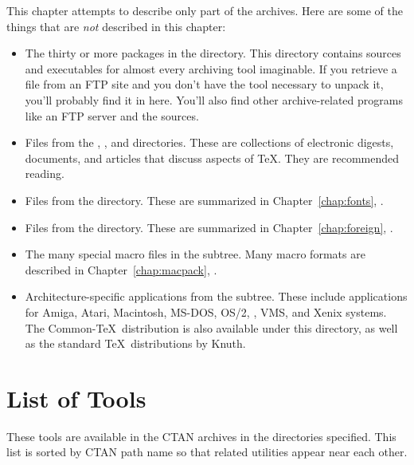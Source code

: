 This chapter attempts to describe only part of the archives.  Here are some
of the things that are {\em not\/} described in this chapter:

\begin{itemize}
  \item The thirty or more packages in the  directory.
        This directory contains sources and executables for almost every 
        archiving tool imaginable.  If you retrieve a file from an FTP site
        and you don't have the tool necessary to unpack it, you'll probably
        find it in here.  You'll also find other archive-related programs
        like an FTP server and the  sources.
  
  \item Files from the , , and
         directories.  These are collections of electronic
        digests, documents, and articles that discuss aspects of \TeX.
        They are recommended reading.

  \item Files from the  directory.  These are summarized in
        Chapter~\ref{chap:fonts}, {\it {}}.

  \item Files from the  directory.  These are summarized
        in Chapter~\ref{chap:foreign}, {\it {}}.

  \item The many special macro files in the  subtree.
        Many macro formats are described in Chapter~\ref{chap:macpack},
       {\it {}}.

  \item Architecture-specific applications from the  
        subtree.  These include applications for Amiga, Atari, 
        Macintosh, MS-DOS, OS/2, \Unix, VMS, and Xenix systems.  The
        Common-\TeX\ distribution is also available under this directory,
        as well as the standard \TeX\ distributions by Knuth.
\end{itemize}

\section{List of Tools}

These tools are available in the CTAN archives in the directories specified.
This list is sorted by CTAN path name so that related utilities appear near
each other.

